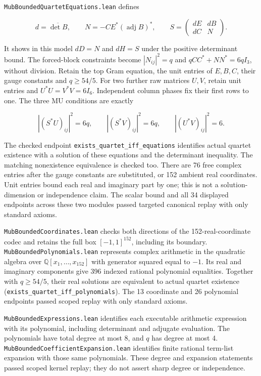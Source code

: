 \documentclass[
]{article}
\begin{document}
\nolinkurl{MubBoundedQuartetEquations.lean} defines

\[
d=\overline{\det B},\qquad N=-CE^*(\operatorname{adj}B)^*,\qquad
S=\begin{pmatrix}dE&dB\\dC&N\end{pmatrix}.
\]

It shows in this model \(dD=N\) and \(dH=S\) under the positive
determinant bound. The forced-block constraints become \(|N_{ij}|^2=q\)
and \(qCC^*+NN^*=6qI_3\), without division. Retain the top Gram
equation, the unit entries of \(E,B,C\), their gauge constants and
\(q\ge54/5\). For two further raw matrices \(U,V\), retain unit entries
and \(U^*U=V^*V=6I_6\). Independent column phases fix their first rows
to one. The three MU conditions are exactly

\[
|(S^*U)_{ij}|^2=6q,\qquad |(S^*V)_{ij}|^2=6q,\qquad
|(U^*V)_{ij}|^2=6.
\]

The checked endpoint \nolinkurl{exists_quartet_iff_equations} identifies
actual quartet existence with a solution of these equations and the
determinant inequality. The matching nonexistence equivalence is checked
too. There are 76 free complex entries after the gauge constants are
substituted, or 152 ambient real coordinates. Unit entries bound each
real and imaginary part by one; this is not a solution-dimension or
independence claim. The scalar bound and all 34 displayed endpoints
across these two modules passed targeted canonical replay with only
standard axioms.

\nolinkurl{MubBoundedCoordinates.lean} checks both directions of the
152-real-coordinate codec and retains the full box \([-1,1]^{152}\),
including its boundary. \nolinkurl{MubBoundedPolynomials.lean}
represents complex arithmetic in the quadratic algebra over
\(\mathbb Q[x_1,\ldots,x_{152}]\) with generator squared equal to
\(-1\). Its real and imaginary components give 396 indexed rational
polynomial equalities. Together with \(q\ge54/5\), their real solutions
are equivalent to actual quartet existence
(\nolinkurl{exists_quartet_iff_polynomials}). The 13 coordinate and 26
polynomial endpoints passed scoped replay with only standard axioms.

\nolinkurl{MubBoundedExpressions.lean} identifies each executable
arithmetic expression with its polynomial, including determinant and
adjugate evaluation. The polynomials have total degree at most 8, and
\(q\) has degree at most 4.
\nolinkurl{MubBoundedCoefficientExpansion.lean} identifies finite
rational term-list expansion with those same polynomials. These degree
and expansion statements passed scoped kernel replay; they do not assert
sharp degree or independence.
\end{document}
